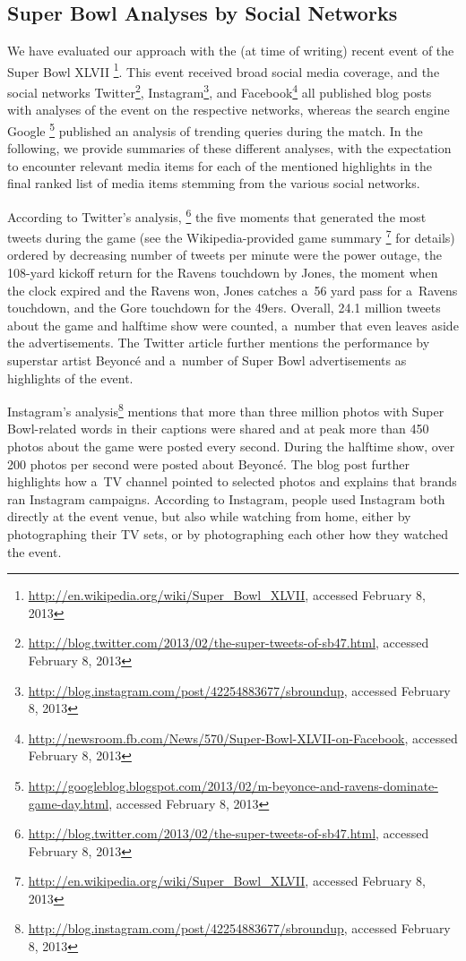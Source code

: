 \subsection{Super Bowl Analyses by Social Networks}

We have evaluated our approach with the (at time of writing)
recent event of the Super Bowl XLVII%
\footnote{\url{http://en.wikipedia.org/wiki/Super_Bowl_XLVII},
accessed February 8, 2013}.
This event received broad social media coverage, and the social networks
Twitter\footnote{\url{http://blog.twitter.com/2013/02/the-super-tweets-of-sb47.html},
accessed February 8, 2013},
Instagram\footnote{\url{http://blog.instagram.com/post/42254883677/sbroundup},
accessed February 8, 2013}, and
Facebook\footnote{\url{http://newsroom.fb.com/News/570/Super-Bowl-XLVII-on-Facebook},
accessed February 8, 2013} all published blog posts with analyses of the event
on the respective networks,
whereas the search engine Google%
\footnote{\url{http://googleblog.blogspot.com/2013/02/m-beyonce-and-ravens-dominate-game-day.html},
accessed February 8, 2013}
published an analysis of trending queries during the match.
In the following, we provide summaries of these different analyses,
with the expectation to encounter relevant media items
for each of the mentioned highlights in the final ranked list of media items
stemming from the various social networks.

According to Twitter's analysis,%
\footnote{\url{http://blog.twitter.com/2013/02/the-super-tweets-of-sb47.html},
accessed February 8, 2013}
the five moments that generated the most tweets
during the game (see the Wikipedia-provided game summary
\footnote{\url{http://en.wikipedia.org/wiki/Super_Bowl_XLVII},
accessed February 8, 2013} for details)
ordered by decreasing number of tweets per minute were
the power outage,
the 108-yard kickoff return for the Ravens touchdown by Jones,
the moment when the clock expired and the Ravens won,
Jones catches a~56 yard pass for a~Ravens touchdown,
and the Gore touchdown for the 49ers.
Overall, 24.1 million tweets about the game and halftime show were counted,
a~number that even leaves aside the advertisements.
The Twitter article further mentions the performance by superstar artist Beyoncé 
and a~number of Super Bowl advertisements as highlights of the event.   

Instagram's analysis\footnote{\url{http://blog.instagram.com/post/42254883677/sbroundup},
accessed February 8, 2013}
mentions that more than three million photos
with Super Bowl-related words in their captions were shared and
at peak more than 450 photos about the game were posted every second.
During the halftime show, over 200 photos per second were posted about Beyoncé.
The blog post further highlights how a~TV channel pointed to selected photos
and explains that brands ran Instagram campaigns.
According to Instagram, people used Instagram both directly at the event venue,
but also while watching from home, either by photographing their TV sets,
or by photographing each other how they watched the event.

